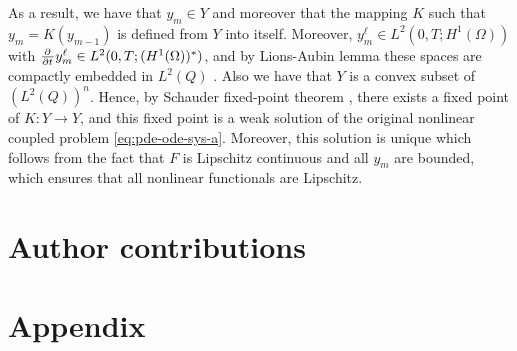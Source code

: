 \documentclass[11pt]{article}
\numberwithin{equation}{section}
\begin{document}
As a result, we have that \(y_m \in Y\) and moreover that the mapping \(K\) such that \( y_m = K(y_{m-1})\) is defined from \(Y \) into itself. Moreover, 
\(y_m^\ell \in L^2(0,T; H^1(\Omega))\) with \(\pd{ }{t} y_m^\ell \in L^2(0,T; (H^1(\Omega))^*)\), and 
by Lions-Aubin lemma these spaces are compactly embedded in \(L^2(Q)\) \cite{Aubin-1963}. Also we have that \(Y\) is a convex subset of \((L^2(Q))^n\). 
Hence, by Schauder fixed-point theorem \cite{Zeidler-1998}, there exists a fixed point of \(K:Y\to Y\), and this fixed point is a weak solution of the original nonlinear coupled problem \eqref{eq:pde-ode-sys-a}. Moreover, this  solution is unique which follows from the fact that \(F\) is Lipschitz continuous and all \(y_m\) are bounded, which ensures that all nonlinear functionals are Lipschitz.































\newpage
\section{Author contributions}

\clearpage
\newpage




% 
\newpage
\nocite{*} 
\printbibliography

\newpage
\appendix
\section*{Appendix}
\renewcommand{\thesubsection}{\Alph{subsection}}
\end{document}
